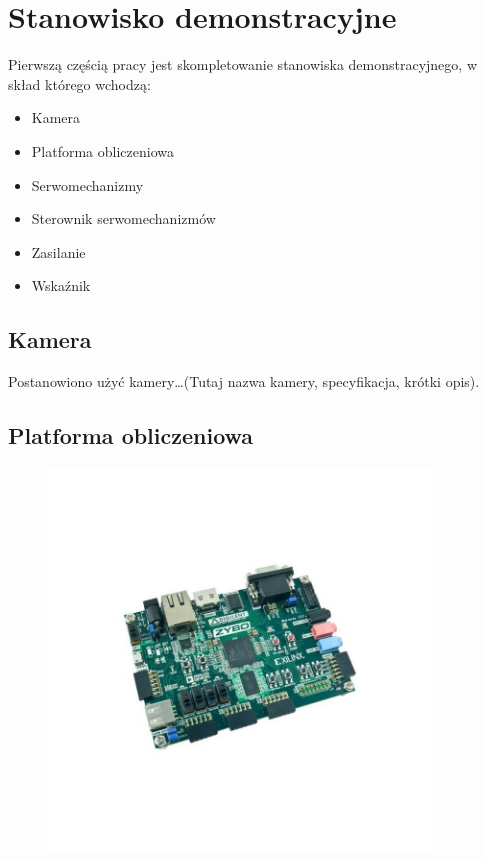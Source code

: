 \chapter{Stanowisko demonstracyjne}
\label{cha:stanowiskodemonstracyjne}

Pierwszą częścią pracy jest skompletowanie stanowiska demonstracyjnego, w skład którego wchodzą:
\begin{itemize}
	\item Kamera
	\item Platforma obliczeniowa
	\item Serwomechanizmy
	\item Sterownik serwomechanizmów
	\item Zasilanie
	\item Wskaźnik
\end{itemize}

\section{Kamera}
\label{sec:kamera}

Postanowiono użyć kamery\dots(Tutaj nazwa kamery, specyfikacja, krótki opis).

\section{Platforma obliczeniowa}
\label{sec:platformaobliczeniowa}

\begin{figure}[H]
	\centering
	\includegraphics[width=4in]{zybo.jpg}
\end{figure}

